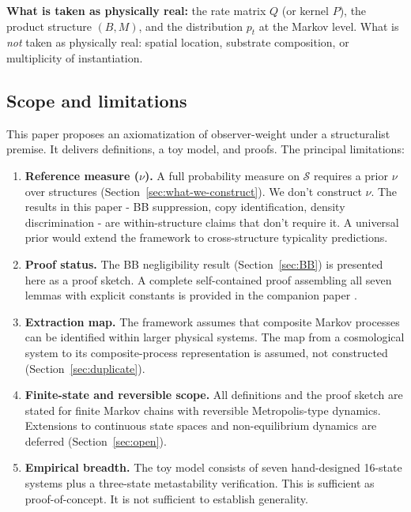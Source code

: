 \documentclass[12pt]{article}
\theoremstyle{remark}
\begin{document}
\noindent\textbf{What is taken as physically real:} the rate matrix $Q$ (or kernel $P$), the product structure $(B, M)$, and the distribution $p_t$ at the Markov level. What is \emph{not} taken as physically real: spatial location, substrate composition, or multiplicity of instantiation.


\subsection{Scope and limitations}\label{sec:scope}

This paper proposes an axiomatization of observer-weight under a structuralist premise. It delivers definitions, a toy model, and proofs. The principal limitations:

\begin{enumerate}[leftmargin=2em]
\item \textbf{Reference measure ($\nu$).} A full probability measure on $\mathcal{S}$ requires a prior $\nu$ over structures (Section~\ref{sec:what-we-construct}). We don't construct $\nu$. The results in this paper - BB suppression, copy identification, density discrimination - are within-structure claims that don't require it. A universal prior would extend the framework to cross-structure typicality predictions.

\item \textbf{Proof status.} The BB negligibility result (Section~\ref{sec:BB}) is presented here as a proof sketch. A complete self-contained proof assembling all seven lemmas with explicit constants is provided in the companion paper \cite{ehrlich2026thma}.

\item \textbf{Extraction map.} The framework assumes that composite Markov processes can be identified within larger physical systems. The map from a cosmological system to its composite-process representation is assumed, not constructed (Section~\ref{sec:duplicate}).

\item \textbf{Finite-state and reversible scope.} All definitions and the proof sketch are stated for finite Markov chains with reversible Metropolis-type dynamics. Extensions to continuous state spaces and non-equilibrium dynamics are deferred (Section~\ref{sec:open}).

\item \textbf{Empirical breadth.} The toy model consists of seven hand-designed 16-state systems plus a three-state metastability verification. This is sufficient as proof-of-concept. It is not sufficient to establish generality.
\end{enumerate}
\end{document}
